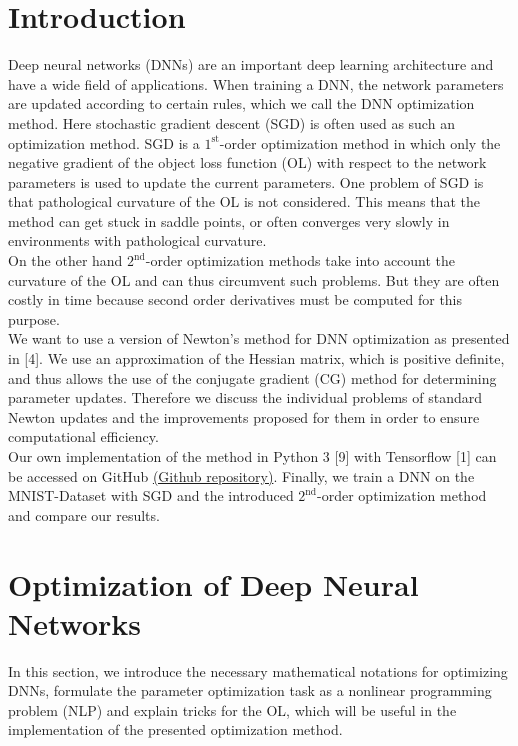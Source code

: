 \documentclass[conference]{IEEEtran}
\begin{document}
	\section{Introduction} 
		\noindent
	Deep neural networks (DNNs) are an important deep learning architecture and have a wide field of applications. When training a DNN, the network parameters are updated according to certain rules, which we call the DNN optimization method. Here stochastic gradient descent (SGD) is often used as such an optimization method. SGD is a $1^{\text{st}}$-order optimization method in which only the negative gradient of the object loss function (OL) with respect to the network parameters is used to update the current parameters.
	One problem of SGD is that pathological curvature of the OL is not considered. This means that the method can get stuck in saddle points, or often converges very slowly in environments with pathological curvature. \\ On the other hand
	$2^{\text{nd}}$-order optimization methods take into account the curvature of the OL and can thus circumvent such problems. But they are often costly in time because second order derivatives must be computed for this purpose. \\
	We want to use a version of Newton's method for DNN optimization as presented in [4].
	We use an approximation of the Hessian matrix, which is positive definite, and thus allows the use of the conjugate gradient (CG) method for determining parameter updates. Therefore we discuss the individual problems of standard Newton updates and the improvements proposed for them in order to ensure computational efficiency.\\
	Our own implementation of the method in Python 3 [9] with Tensorflow [1] can be accessed on GitHub \href{https://github.com/NiklasBrunn/Hessian_Free_Optimization_of_Deep_Neural_Networks}{(Github repository)}. Finally, we train a DNN on the MNIST-Dataset with SGD and the introduced $2^{\text{nd}}$-order optimization method and compare our results.
	
	
	\section{Optimization of Deep Neural Networks}
		\noindent
	In this section, we introduce the necessary mathematical notations for optimizing DNNs, formulate the parameter optimization task as a nonlinear programming problem (NLP) and explain tricks for the OL, which will be useful in the implementation of the presented optimization method.
	
\end{document}
